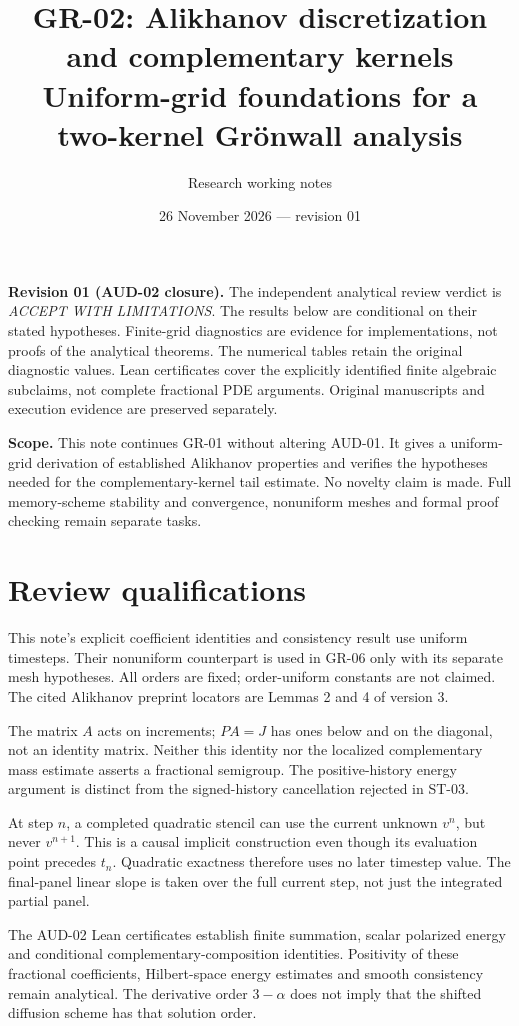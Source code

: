 \documentclass[11pt,a4paper]{article}
\title{GR-02: Alikhanov discretization and complementary kernels\\\large Uniform-grid foundations for a two-kernel Gr\"onwall analysis}
\author{Research working notes}
\date{26 November 2026 --- revision 01}
\begin{document}
\maketitle
\noindent\textbf{Revision 01 (AUD-02 closure).}
The independent analytical review verdict is \emph{ACCEPT WITH LIMITATIONS}.
The results below are conditional on their stated hypotheses. Finite-grid
diagnostics are evidence for implementations, not proofs of the analytical
theorems. The numerical tables retain the original diagnostic values.
Lean certificates cover the explicitly identified finite algebraic subclaims,
not complete fractional PDE arguments. Original manuscripts and execution
evidence are preserved separately.

\noindent\textbf{Scope.} This note continues GR-01 without altering AUD-01. It gives a uniform-grid derivation of established Alikhanov properties and verifies the hypotheses needed for the complementary-kernel tail estimate. No novelty claim is made. Full memory-scheme stability and convergence, nonuniform meshes and formal proof checking remain separate tasks.

\section*{Review qualifications}
This note's explicit coefficient identities and consistency result use uniform
timesteps. Their nonuniform counterpart is used in GR-06 only with its separate
mesh hypotheses. All orders are fixed; order-uniform constants are not claimed.
The cited Alikhanov preprint locators are Lemmas 2 and 4 of version 3.

The matrix $A$ acts on increments; $PA=J$ has ones below and on the diagonal,
not an identity matrix. Neither this identity nor the localized complementary
mass estimate asserts a fractional semigroup. The positive-history energy
argument is distinct from the signed-history cancellation rejected in ST-03.

At step $n$, a completed quadratic stencil can use the current unknown $v^n$,
but never $v^{n+1}$. This is a causal implicit construction even though its
evaluation point precedes $t_n$. Quadratic exactness therefore uses no later
timestep value. The final-panel linear slope is taken over the full current
step, not just the integrated partial panel.

The AUD-02 Lean certificates establish finite summation, scalar polarized
energy and conditional complementary-composition identities. Positivity of
these fractional coefficients, Hilbert-space energy estimates and smooth
consistency remain analytical. The derivative order $3-\alpha$ does not imply
that the shifted diffusion scheme has that solution order.
\end{document}
